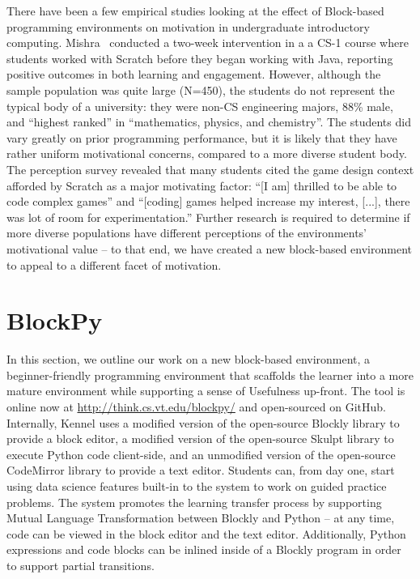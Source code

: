 \documentclass{sig-alternate}
\begin{document}
There have been a few empirical studies looking at the effect of Block-based programming environments on motivation in undergraduate introductory computing.
Mishra~\cite{Mishra} conducted a two-week intervention in a a CS-1 course where students worked with Scratch before they began working with Java, reporting positive outcomes in both learning and engagement.
However, although the sample population was quite large (N=450), the students do not represent the typical body of a university: they were non-CS engineering majors, 88\% male, and ``highest ranked'' in ``mathematics, physics, and chemistry''.
The students did vary greatly on prior programming performance, but it is likely that they have rather uniform motivational concerns, compared to a more diverse student body.
The perception survey revealed that many students cited the game design context afforded by Scratch as a major motivating factor: ``[I am] thrilled to be able to code complex games'' and ``[coding] games helped increase my interest, [...], there was lot of room for experimentation.''
Further research is required to determine if more diverse populations have different perceptions of the environments' motivational value -- to that end, we have created a new block-based environment to appeal to a different facet of motivation.

\section{BlockPy}
	
In this section, we outline our work on a new block-based environment, a beginner-friendly programming environment that scaffolds the learner into a more mature environment while supporting a sense of Usefulness up-front.
The tool is online now at \url{http://think.cs.vt.edu/blockpy/} and open-sourced on GitHub.
Internally, Kennel uses a modified version of the open-source Blockly library to provide a block editor, a modified version of the open-source Skulpt library to execute Python code client-side, and an unmodified version of the open-source CodeMirror library to provide a text editor.
Students can, from day one, start using data science features built-in to the system to work on guided practice problems.
The system promotes the learning transfer process by supporting Mutual Language Transformation between Blockly and Python -- at any time, code can be viewed in the block editor and the text editor.
Additionally, Python expressions and code blocks can be inlined inside of a Blockly program in order to support partial transitions.
\end{document}
